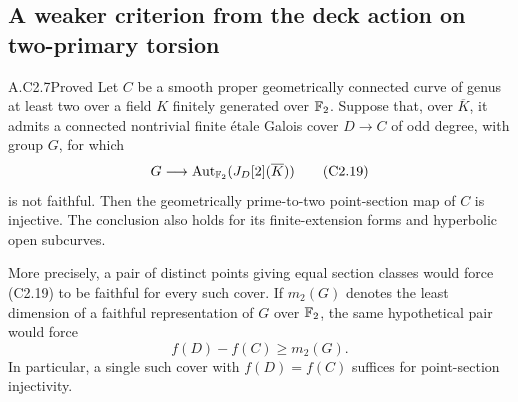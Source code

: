 \subsection{A weaker criterion from the deck action on two-primary torsion}

\begin{claim}{A.C2.7}{Proved}
Let $C$ be a smooth proper geometrically connected curve of genus at
least two over a field $K$ finitely generated over $\mathbb F_2$. Suppose that,
over $\overline K$, it admits a connected nontrivial finite \'etale
Galois cover $D\to C$ of odd degree, with group $G$, for which
\[
             G\longrightarrow
             \operatorname{Aut}_{\mathbb F_2}(J_D[2](\overline K))
                                                               \tag{C2.19}
\]
is not faithful. Then the geometrically prime-to-two point-section
map of $C$ is injective. The conclusion also holds for its
finite-extension forms and hyperbolic open subcurves.

More precisely, a pair of distinct points giving equal section classes
would force (C2.19) to be faithful for every such cover. If
$m_2(G)$ denotes the least dimension of a faithful representation of
$G$ over $\mathbb F_2$, the same hypothetical pair would force
\[
                            f(D)-f(C)\ge m_2(G).               \tag{C2.20}
\]
In particular, a single such cover with $f(D)=f(C)$ suffices for
point-section injectivity.
\end{claim}
